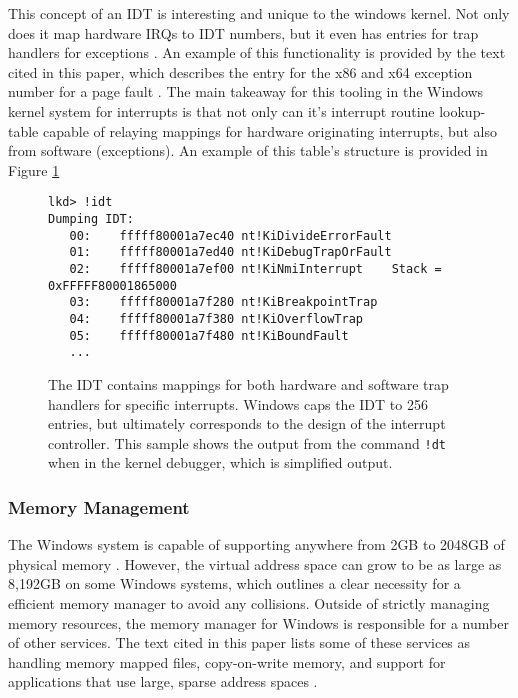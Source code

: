 \documentclass[10pt,draftclsnofoot,onecolumn]{IEEEtran}
\begin{document}
\par This concept of an IDT is interesting and unique to the windows kernel.
Not only does it map hardware IRQs to IDT numbers, but it even has entries for trap handlers for exceptions \cite{win:1}.
An example of this functionality is provided by the text cited in this paper, which describes the entry for the x86 and x64 exception number for a page fault \cite{win:1}.
The main takeaway for this tooling in the Windows kernel system for interrupts is that not only can it's interrupt routine lookup-table capable of relaying mappings for hardware originating interrupts, but also from software (exceptions).
An example of this table's structure is provided in Figure \ref{code:idt_sample}

\begin{figure}[h]
\begin{lstlisting}
lkd> !idt
Dumping IDT:
   00:    fffff80001a7ec40 nt!KiDivideErrorFault
   01:    fffff80001a7ed40 nt!KiDebugTrapOrFault
   02:    fffff80001a7ef00 nt!KiNmiInterrupt    Stack = 0xFFFFF80001865000
   03:    fffff80001a7f280 nt!KiBreakpointTrap
   04:    fffff80001a7f380 nt!KiOverflowTrap
   05:    fffff80001a7f480 nt!KiBoundFault
   ...
\end{lstlisting}
\centering
\captionsetup{justification=centering}
\caption{
  The IDT contains mappings for both hardware and software trap handlers for specific interrupts.
  Windows caps the IDT to 256 entries, but ultimately corresponds to the design of the interrupt controller.
  This sample shows the output from the command \texttt{!dt} when in the kernel debugger, which is simplified output.
}
\label{code:idt_sample}
\end{figure}

\subsubsection{Memory Management}
\label{sub:Memory Management Windows}
\par The Windows system is capable of supporting anywhere from 2GB to 2048GB of physical memory \cite{win:2}.
However, the virtual address space can grow to be as large as 8,192GB on some Windows systems, which outlines a clear necessity for a efficient memory manager to avoid any collisions.
Outside of strictly managing memory resources, the memory manager for Windows is responsible for a number of other services.
The text cited in this paper lists some of these services as handling memory mapped files, copy-on-write memory, and support for applications that use large, sparse address spaces \cite{win:2}.
\end{document}
